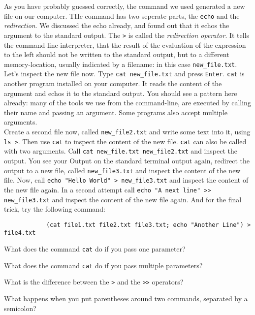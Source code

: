 \begin{challenge}
    \begin{task}
        As you have probably guessed correctly, the command we used generated a new file on our computer.
        THe command has two seperate parts, the \texttt{echo} and the \textit{redirection}.
        We discussed the echo already, and found out that it echos the argument to the standard output.
        The \texttt{>} is called the \textit{redirection operator}.
        It tells the command-line-interpreter, that the result of the evaluation of the expression to the left should not be written to the standard output, but to a different memory-location, usually indicated by a filename: in this case \texttt{new_file.txt}.
        Let's inspect the new file now.
        Type \texttt{cat new_file.txt} and press \texttt{Enter}.
        \texttt{cat} is another program installed on your computer.
        It reads the content of the argument and echos it to the standard output.
        You should see a pattern here already: many of the tools we use from the command-line, are executed by calling their name and passing an argument.
        Some programs also accept multiple arguments.\\
        Create a second file now, called \texttt{new_file2.txt} and write some text into it, using \texttt{ls >}.
        Then use \texttt{cat} to inspect the content of the new file.
        \texttt{cat} can also be called with two arguments. 
        Call \texttt{cat new_file.txt new_file2.txt} and inspect the output.
        You see your Output on the standard terminal output again, redirect the output to a new file, called \texttt{new_file3.txt} and inspect the content of the new file.
        Now, call \texttt{echo "Hello World" > new_file3.txt} and inspect the content of the new file again.
        In a second attempt call \texttt{echo "A next line" >> new_file3.txt} and inspect the content of the new file again.
        And for the final trick, try the following command:
        \begin{lstlisting}
            (cat file1.txt file2.txt file3.txt; echo "Another Line") > file4.txt
        \end{lstlisting}
        \begin{questions}
            \item What does the command \texttt{cat} do if you pass one parameter?
            \item What does the command \texttt{cat} do if you pass multiple parameters?
            \item What is the difference between the \texttt{>} and the \texttt{>>} operators?
            \item What happens when you put parentheses around two commands, separated by a semicolon?
        \end{questions}
    \end{task}


\end{challenge}
